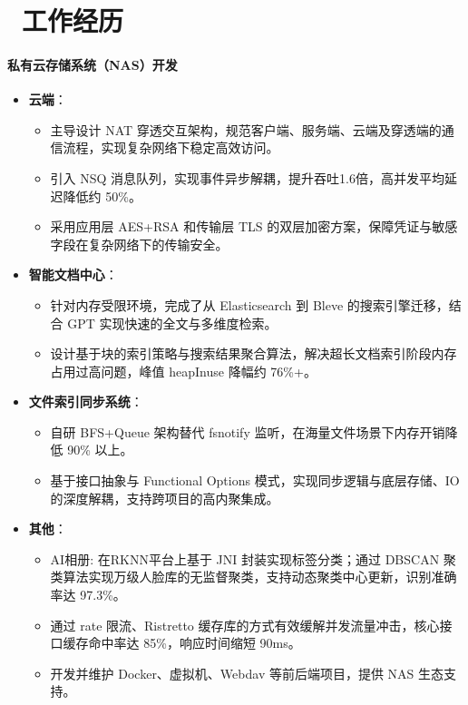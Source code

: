 \documentclass{resume}
\begin{document}
\section{\faSuitcase\ 工作经历}

\paragraph*{私有云存储系统（NAS）开发}

\begin{itemize}

    \item \textbf{云端}：
    \begin{itemize}
        \item 主导设计 NAT 穿透交互架构，规范客户端、服务端、云端及穿透端的通信流程，实现复杂网络下稳定高效访问。
        \item 引入 NSQ 消息队列，实现事件异步解耦，提升吞吐1.6倍，高并发平均延迟降低约 50\%。
        \item 采用应用层 AES+RSA 和传输层 TLS 的双层加密方案，保障凭证与敏感字段在复杂网络下的传输安全。
    \end{itemize}

    \item \textbf{智能文档中心}：
    \begin{itemize}
        \item 针对内存受限环境，完成了从 Elasticsearch 到 Bleve 的搜索引擎迁移，结合 GPT 实现快速的全文与多维度检索。
        \item 设计基于块的索引策略与搜索结果聚合算法，解决超长文档索引阶段内存占用过高问题，峰值 heapInuse 降幅约 76\%+。
    \end{itemize}
    
    \item \textbf{文件索引同步系统}：
    \begin{itemize}
        \item 自研 BFS+Queue 架构替代 fsnotify 监听，在海量文件场景下内存开销降低 90\% 以上。
        \item 基于接口抽象与 Functional Options 模式，实现同步逻辑与底层存储、IO 的深度解耦，支持跨项目的高内聚集成。
    \end{itemize}
    
    \item \textbf{其他}：
    \begin{itemize}
        \item AI相册: 在RKNN平台上基于 JNI 封装实现标签分类；通过 DBSCAN 聚类算法实现万级人脸库的无监督聚类，支持动态聚类中心更新，识别准确率达 97.3\%。
        \item 通过 rate 限流、Ristretto 缓存库的方式有效缓解并发流量冲击，核心接口缓存命中率达 85\%，响应时间缩短 90ms。
        \item 开发并维护 Docker、虚拟机、Webdav 等前后端项目，提供 NAS 生态支持。
    \end{itemize}

\end{itemize}
\end{document}
